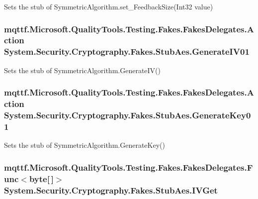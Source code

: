 Sets the stub of Symmetric\-Algorithm.\-set\-\_\-\-Feedback\-Size(\-Int32 value)

\hypertarget{class_system_1_1_security_1_1_cryptography_1_1_fakes_1_1_stub_aes_a122e5d710586aec600bc52c87a553692}{
\subsubsection[{Generate\-I\-V01}]{\setlength{\rightskip}{0pt plus 5cm}mqttf.\-Microsoft.\-Quality\-Tools.\-Testing.\-Fakes.\-Fakes\-Delegates.\-Action System.\-Security.\-Cryptography.\-Fakes.\-Stub\-Aes.\-Generate\-I\-V01}}\label{class_system_1_1_security_1_1_cryptography_1_1_fakes_1_1_stub_aes_a122e5d710586aec600bc52c87a553692}


Sets the stub of Symmetric\-Algorithm.\-Generate\-I\-V()

\hypertarget{class_system_1_1_security_1_1_cryptography_1_1_fakes_1_1_stub_aes_a6e5edc13db53dba930dbe030eac523af}{
\subsubsection[{Generate\-Key01}]{\setlength{\rightskip}{0pt plus 5cm}mqttf.\-Microsoft.\-Quality\-Tools.\-Testing.\-Fakes.\-Fakes\-Delegates.\-Action System.\-Security.\-Cryptography.\-Fakes.\-Stub\-Aes.\-Generate\-Key01}}\label{class_system_1_1_security_1_1_cryptography_1_1_fakes_1_1_stub_aes_a6e5edc13db53dba930dbe030eac523af}


Sets the stub of Symmetric\-Algorithm.\-Generate\-Key()

\hypertarget{class_system_1_1_security_1_1_cryptography_1_1_fakes_1_1_stub_aes_a2c44065f1ef111d5242506c1539f7656}{
\subsubsection[{I\-V\-Get}]{\setlength{\rightskip}{0pt plus 5cm}mqttf.\-Microsoft.\-Quality\-Tools.\-Testing.\-Fakes.\-Fakes\-Delegates.\-Func$<$byte\mbox{[}$\,$\mbox{]}$>$ System.\-Security.\-Cryptography.\-Fakes.\-Stub\-Aes.\-I\-V\-Get}}\label{class_system_1_1_security_1_1_cryptography_1_1_fakes_1_1_stub_aes_a2c44065f1ef111d5242506c1539f7656}


